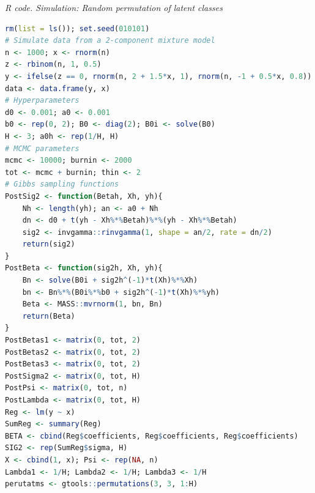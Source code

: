 \begin{enumerate}[leftmargin=*]
\begin{tcolorbox}[enhanced,width=4.67in,center upper,
	fontupper=\large\bfseries,drop shadow southwest,sharp corners]
	\textit{R code. Simulation: Random permutation of latent classes}
	\begin{VF}
		\begin{lstlisting}[language=R]
rm(list = ls()); set.seed(010101)
# Simulate data from a 2-component mixture model
n <- 1000; x <- rnorm(n)
z <- rbinom(n, 1, 0.5)
y <- ifelse(z == 0, rnorm(n, 2 + 1.5*x, 1), rnorm(n, -1 + 0.5*x, 0.8))
data <- data.frame(y, x)
# Hyperparameters
d0 <- 0.001; a0 <- 0.001
b0 <- rep(0, 2); B0 <- diag(2); B0i <- solve(B0)
H <- 3; a0h <- rep(1/H, H)
# MCMC parameters
mcmc <- 10000; burnin <- 2000
tot <- mcmc + burnin; thin <- 2
# Gibbs sampling functions
PostSig2 <- function(Betah, Xh, yh){
	Nh <- length(yh); an <- a0 + Nh
	dn <- d0 + t(yh - Xh%*%Betah)%*%(yh - Xh%*%Betah)
	sig2 <- invgamma::rinvgamma(1, shape = an/2, rate = dn/2)
	return(sig2)
}
PostBeta <- function(sig2h, Xh, yh){
	Bn <- solve(B0i + sig2h^(-1)*t(Xh)%*%Xh)
	bn <- Bn%*%(B0i%*%b0 + sig2h^(-1)*t(Xh)%*%yh)
	Beta <- MASS::mvrnorm(1, bn, Bn)
	return(Beta)
}
PostBetas1 <- matrix(0, tot, 2)
PostBetas2 <- matrix(0, tot, 2)
PostBetas3 <- matrix(0, tot, 2)
PostSigma2 <- matrix(0, tot, H)
PostPsi <- matrix(0, tot, n)
PostLambda <- matrix(0, tot, H)
Reg <- lm(y ~ x)
SumReg <- summary(Reg)
BETA <- cbind(Reg$coefficients, Reg$coefficients, Reg$coefficients)
SIG2 <- rep(SumReg$sigma, H)
X <- cbind(1, x); Psi <- rep(NA, n)
Lambda1 <- 1/H; Lambda2 <- 1/H; Lambda3 <- 1/H
perutatms <- gtools::permutations(3, 3, 1:H)
\end{lstlisting}
	\end{VF}
\end{tcolorbox}


\end{enumerate}
